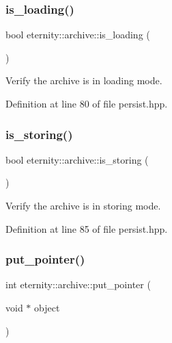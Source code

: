 \subsubsection{\texorpdfstring{is\+\_\+loading()}{is\_loading()}}
{\footnotesize\ttfamily bool eternity\+::archive\+::is\+\_\+loading (\begin{DoxyParamCaption}{ }\end{DoxyParamCaption})\hspace{0.3cm}{\ttfamily [inline]}}



Verify the archive is in loading mode. 



Definition at line 80 of file persist.\+hpp.

\mbox{\label{classeternity_1_1archive_afbd7e1d21409eae43622049624277405}} 
\subsubsection{\texorpdfstring{is\+\_\+storing()}{is\_storing()}}
{\footnotesize\ttfamily bool eternity\+::archive\+::is\+\_\+storing (\begin{DoxyParamCaption}{ }\end{DoxyParamCaption})\hspace{0.3cm}{\ttfamily [inline]}}



Verify the archive is in storing mode. 



Definition at line 85 of file persist.\+hpp.

\mbox{\label{classeternity_1_1archive_a2c4ab8d0935b130b38bce44f600bee99}} 
\subsubsection{\texorpdfstring{put\+\_\+pointer()}{put\_pointer()}}
{\footnotesize\ttfamily int eternity\+::archive\+::put\+\_\+pointer (\begin{DoxyParamCaption}\item[{void $\ast$}]{object }\end{DoxyParamCaption})}

